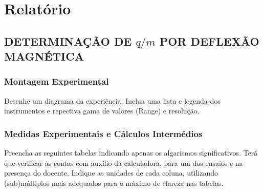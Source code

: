 \documentclass[a4paper,12pt]{article}  %
\begin{document}
\section{\sf Relatório}
\subsection{\sf DETERMINAÇÃO DE $q/m$ POR  DEFLEXÃO MAGNÉTICA}
\subsubsection{\sf Montagem Experimental}
Desenhe um diagrama da experiência. Inclua uma lista e legenda dos instrumentos e repectiva gama de valores (Range) e resolução.
\begin{center}
\framebox[18cm]{\rule{0pt}{12cm}}
\end{center}





\subsubsection{\sf Medidas Experimentais e Cálculos Intermédios } \label{sec:dados}
Preencha as seguintes tabelas indicando apenas os algarismos significativos. Terá que verificar as contas com auxílio da calculadora, para um dos ensaios e na presença do docente. Indique as unidades de cada coluna, utilizando (sub)múltiplos mais adequados para o máximo de clareza nas tabelas.
\newpage
\end{document}
